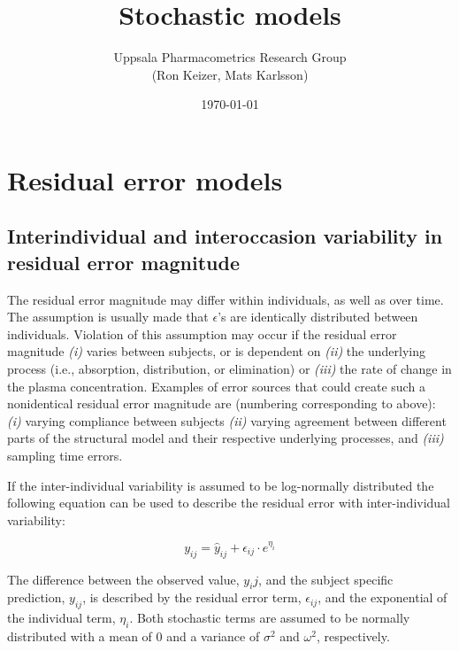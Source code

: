 \documentclass[a4paper,11pt]{article}
\begin{document}
\title{Stochastic models}
\author{Uppsala Pharmacometrics Research Group\\{\small(Ron Keizer, Mats Karlsson)}}
\date{\today}

\maketitle
{\small
  \tableofcontents
}

\pagebreak
\setlength{\parindent}{0pt}
\setlength{\parskip}{2ex}

\section{Residual error models}

\subsection{Interindividual and interoccasion variability in residual error magnitude}
The residual error magnitude may differ within individuals, as well as
over time. The assumption is usually made that $\epsilon$'s are
identically distributed between individuals. Violation of this
assumption may occur if the residual error magnitude \emph{(i)} varies
between subjects, or is dependent on \emph{(ii)} the underlying
process (i.e., absorption, distribution, or elimination) or
\emph{(iii)} the rate of change in the plasma concentration. Examples
of error sources that could create such a nonidentical residual error
magnitude are (numbering corresponding to above): \emph{(i)} varying
compliance between subjects \emph{(ii)} varying agreement between
different parts of the structural model and their respective
underlying processes, and \emph{(iii)} sampling time errors.

If the inter-individual variability is assumed to be log-normally
distributed the following equation can be used to describe the
residual error with inter-individual variability:

\begin{equation}
y_{ij} = \hat{y}_{ij} + \epsilon_{ij} \cdot e^{\eta_i}
\end{equation}

The difference between the observed value, $y_ij$, and the subject
specific prediction, $y_{ij}$, is described by the residual error
term, $\epsilon_{ij}$, and the exponential of the individual term,
$\eta_{i}$. Both stochastic terms are assumed to be normally distributed with a
mean of 0 and a variance of $\sigma^2$ and $\omega^2$, respectively.
\end{document}
